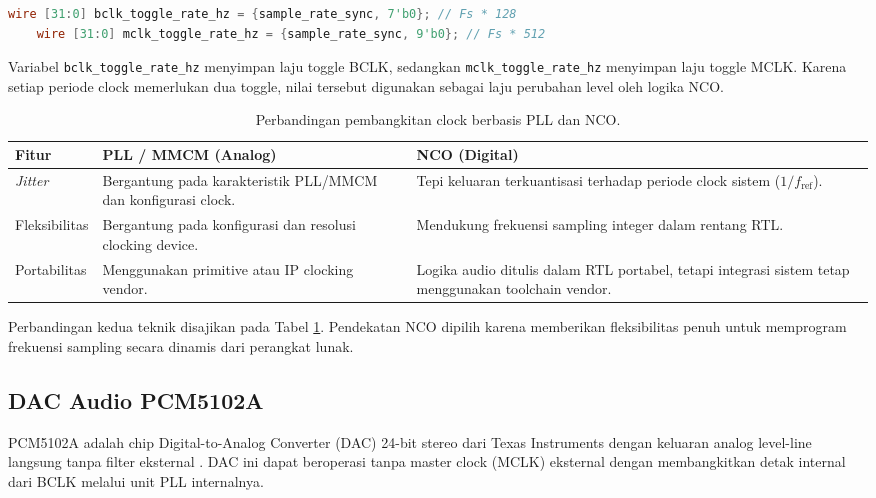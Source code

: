 \begin{lstlisting}[language=Verilog,caption={Implementasi pergeseran bit untuk laju toggle BCLK dan MCLK.},label={lst:nco_shift_rates},breaklines=true]
	wire [31:0] bclk_toggle_rate_hz = {sample_rate_sync, 7'b0}; // Fs * 128
	wire [31:0] mclk_toggle_rate_hz = {sample_rate_sync, 9'b0}; // Fs * 512
\end{lstlisting}

Variabel \texttt{bclk\_toggle\_rate\_hz} menyimpan laju toggle BCLK, sedangkan \texttt{mclk\_toggle\_rate\_hz} menyimpan laju toggle MCLK. Karena setiap periode clock memerlukan dua toggle, nilai tersebut digunakan sebagai laju perubahan level oleh logika NCO.

\begin{table}[htbp]
\centering
\caption{Perbandingan pembangkitan clock berbasis PLL dan NCO.}
\label{tab:pll_vs_nco}
\begin{tabular}{|l|p{5.5cm}|p{5.5cm}|}
\hline
\textbf{Fitur} & \textbf{PLL / MMCM (Analog)} & \textbf{NCO (Digital)} \\
\hline
\textit{Jitter} & Bergantung pada karakteristik PLL/MMCM dan konfigurasi clock. & Tepi keluaran terkuantisasi terhadap periode clock sistem ($1/f_{\mathrm{ref}}$). \\
Fleksibilitas & Bergantung pada konfigurasi dan resolusi clocking device. & Mendukung frekuensi sampling integer dalam rentang RTL. \\
Portabilitas & Menggunakan primitive atau IP clocking vendor. & Logika audio ditulis dalam RTL portabel, tetapi integrasi sistem tetap menggunakan toolchain vendor. \\
\hline
\end{tabular}
\end{table}

Perbandingan kedua teknik disajikan pada Tabel \ref{tab:pll_vs_nco}. Pendekatan NCO dipilih karena memberikan fleksibilitas penuh untuk memprogram frekuensi sampling secara dinamis dari perangkat lunak.

\subsection{DAC Audio PCM5102A}

PCM5102A adalah chip Digital-to-Analog Converter (DAC) 24-bit stereo dari Texas Instruments dengan keluaran analog level-line langsung tanpa filter eksternal \citep{pcm5102a_datasheet}. DAC ini dapat beroperasi tanpa master clock (MCLK) eksternal dengan membangkitkan detak internal dari BCLK melalui unit PLL internalnya.

